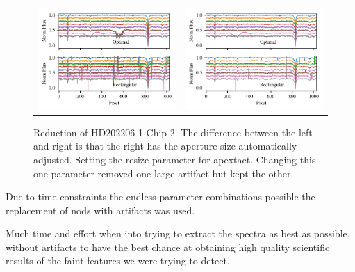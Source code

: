 \begin{figure}
    \centering
    \begin{tabular}{cc}
    \includegraphics[width=0.5\linewidth]{figures/reduction/bp_plots/non_resized_nods_HD202206-1_chip_2} & \includegraphics[width=0.5\linewidth]{figures/reduction/bp_plots/resized_nods_HD202206-1_chip_2}\\
    \end{tabular}
    \caption{Reduction of HD202206-1  Chip 2. The difference between the left and right is that the right has the aperture size automatically adjusted. Setting the resize parameter for apextact. Changing this one parameter removed one large artifact but kept the other. }
    \label{fig:resizednods}
\end{figure}

Due to time constraints the endless parameter combinations possible the  replacement of nods with artifacts was used.  

Much time and effort when into trying to extract the spectra as best as possible, without artifacts to have the best chance at obtaining high quality scientific results of the faint features we were trying to detect.


